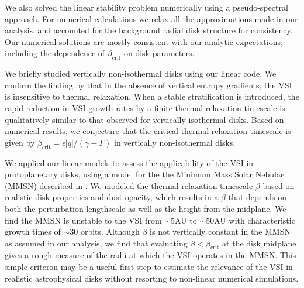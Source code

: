 We also solved the linear stability problem numerically using a
pseudo-spectral approach. For numerical calculations we relax all the
approximations made in our analysis, and accounted for
the background radial disk structure for consistency.  Our
numerical solutions are mostly consistent with our analytic 
expectations, including the dependence of $\beta_\mathrm{crit}$ on
disk parameters.  %


We briefly studied vertically non-isothermal disks using our linear 
code. We confirm the finding by \cite{nelson13} that in the absence
of vertical entropy gradients, the VSI is insensitive to
thermal relaxation. When a stable stratification is introduced, the
rapid reduction in VSI growth rates by a finite thermal relaxation
timescale is qualitatively similar to that observed for vertically
isothermal disks. Based on numerical results, we conjecture that the
critical thermal relaxation timescale is given by 
$\beta_\mathrm{crit}=\epsilon|q|/(\gamma-\Gamma)$ in vertically 
non-isothermal disks.  


We applied our linear models to assess the applicability of the VSI in
protoplanetary disks, using a model for the the Minimum Mass Solar Nebulae
(MMSN) described in \cite{chiang10}. We  
modeled the thermal relaxation timescale $\beta$ based on realistic
disk properties and dust opacity, which results in a $\beta$ that
depends on both the perturbation lengthscale as well as the height
from the midplane. We find the MMSN is unstable to the VSI
from $\sim 5$AU to $\sim50$AU with characteristic growth times of
$\sim 30$ orbits. Although $\beta$ is not vertically constant in the
MMSN as assumed in our analysis, we find that evaluating $\beta <
\beta_\mathrm{crit}$ at the disk midplane gives a rough measure of the
radii at which the VSI operates in the MMSN.  This simple criteron may
be a useful first step to estimate the relevance of the VSI in
realistic astrophysical disks without resorting to non-linear
numerical simulations.  


